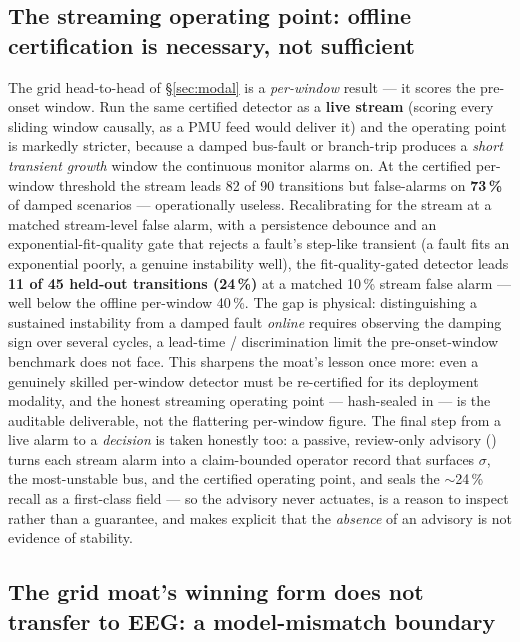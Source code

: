 \documentclass[11pt]{article}
\begin{document}
\subsection{The streaming operating point: offline certification is
necessary, not sufficient}\label{sec:stream}

The grid head-to-head of \S\ref{sec:modal} is a \emph{per-window} result
--- it scores the pre-onset window. Run the same certified detector as a
\textbf{live stream} (scoring every sliding window causally, as a PMU
feed would deliver it) and the operating point is markedly stricter,
because a damped bus-fault or branch-trip produces a \emph{short
transient growth} window the continuous monitor alarms on. At the
certified per-window threshold the stream leads 82 of 90 transitions but
false-alarms on \textbf{73\,\%} of damped scenarios --- operationally
useless. Recalibrating for the stream at a matched stream-level false
alarm, with a persistence debounce and an exponential-fit-quality gate
that rejects a fault's step-like transient (a fault fits an exponential
poorly, a genuine instability well), the fit-quality-gated detector
leads \textbf{11 of 45 held-out transitions (24\,\%)} at a matched
10\,\% stream false alarm --- well below the offline per-window 40\,\%.
The gap is physical: distinguishing a sustained instability from a
damped fault \emph{online} requires observing the damping sign over
several cycles, a lead-time / discrimination limit the pre-onset-window
benchmark does not face. This sharpens the moat's lesson once more: even
a genuinely skilled per-window detector must be re-certified for its
deployment modality, and the honest streaming operating point ---
hash-sealed in
--- is the auditable deliverable, not the flattering per-window figure.
The final step from a live alarm to a \emph{decision} is taken honestly
too: a passive, review-only advisory
() turns each stream
alarm into a claim-bounded operator record that surfaces $\sigma$, the
most-unstable bus, and the certified operating point, and seals the
$\sim$24\,\% recall as a first-class field --- so the advisory never
actuates, is a reason to inspect rather than a guarantee, and makes
explicit that the \emph{absence} of an advisory is not evidence of
stability.

\subsection{The grid moat's winning form does not transfer to EEG: a
model-mismatch boundary}\label{sec:eegtransfer}
\end{document}
